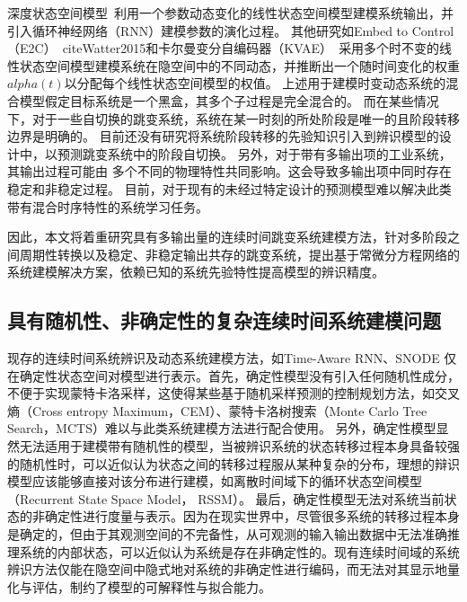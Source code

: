 深度状态空间模型~\cite{Deep_state_space_model}利用一个参数动态变化的线性状态空间模型建模系统输出，并引入循环神经网络（RNN）建模参数的演化过程。
其他研究如Embed to Control（E2C）~cite{Watter2015}和卡尔曼变分自编码器（KVAE）~\cite{Fraccaro2017}采用多个时不变的线性状态空间模型建模系统在隐空间中的不同动态，并推断出一个随时间变化的权重$alpha(t)$以分配每个线性状态空间模型的权值。
上述用于建模时变动态系统的混合模型假定目标系统是一个黑盒，其多个子过程是完全混合的。
而在某些情况下，对于一些自切换的跳变系统，系统在某一时刻的所处阶段是唯一的且阶段转移边界是明确的。
目前还没有研究将系统阶段转移的先验知识引入到辨识模型的设计中，以预测跳变系统中的阶段自切换。  
另外，对于带有多输出项的工业系统，其输出过程可能由
多个不同的物理特性共同影响。这会导致多输出项中同时存在稳定和非稳定过程\cite{nason2006stationary}。
目前，对于现有的未经过特定设计的预测模型难以解决此类带有混合时序特性的系统学习任务。

因此，本文将着重研究具有多输出量的连续时间跳变系统建模方法，针对多阶段之间周期性转换以及稳定、非稳定输出共存的跳变系统，提出基于常微分方程网络的系统建模解决方案，依赖已知的系统先验特性提高模型的辨识精度。

\subsection{具有随机性、非确定性的复杂连续时间系统建模问题}
现存的连续时间系统辨识及动态系统建模方法，如Time-Aware RNN\cite{Demeester2019}、SNODE\cite{Quaglino2019} 仅在确定性状态空间对模型进行表示。首先，确定性模型没有引入任何随机性成分，不便于实现蒙特卡洛采样，这使得某些基于随机采样预测的控制规划方法，如交叉熵（Cross entropy Maximum，CEM）、蒙特卡洛树搜索（Monte Carlo Tree Search，MCTS）难以与此类系统建模方法进行配合使用。
另外，确定性模型显然无法适用于建模带有随机性的模型，当被辨识系统的状态转移过程本身具备较强的随机性时，可以近似认为状态之间的转移过程服从某种复杂的分布，理想的辩识模型应该能够直接对该分布进行建模，如离散时间域下的循环状态空间模型（Recurrent State Space Model， RSSM）。
最后，确定性模型无法对系统当前状态的非确定性进行度量与表示。因为在现实世界中，尽管很多系统的转移过程本身是确定的，但由于其观测空间的不完备性，从可观测的输入输出数据中无法准确推理系统的内部状态，可以近似认为系统是存在非确定性的。现有连续时间域的系统辨识方法仅能在隐空间中隐式地对系统的非确定性进行编码，而无法对其显示地量化与评估，制约了模型的可解释性与拟合能力。

